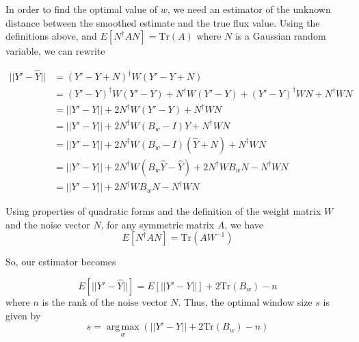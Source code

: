 In order to find the optimal value of $w$, we need an estimator of the unknown distance between the smoothed estimate and the true flux value. Using the definitions above, and $E[N^\dagger A N]=\mathrm{Tr}(A)$ where $N$ is a Gaussian random variable, we can rewrite

\begin{align*}
    ||Y'-\hat{Y}|| &= (Y'-Y+N)^\dagger W(Y'-Y+N)\\
    &= (Y'-Y)^\dagger W(Y'-Y)+N^\dagger W(Y'-Y) + (Y'-Y)^\dagger W N + N^\dagger W N\\
    &= ||Y'-Y||+2N^\dagger W(Y'-Y)+N^\dagger WN\\
    &= ||Y'-Y||+2N^\dagger W(B_w - I)Y + N^\dagger WN\\
    &= ||Y'-Y||+2N^\dagger W(B_w - I)(\hat{Y}+N) + N^\dagger WN\\
    &= ||Y'-Y||+2N^\dagger W (B_w\hat{Y}-\hat{Y}) + 2N^\dagger W B_w N - N^\dagger W N\\
    &= ||Y'-Y|| + 2N^\dagger W B_w N - N^\dagger W N
\end{align*}

Using properties of quadratic forms and the definition of the weight matrix $W$ and the noise vector $N$, for any symmetric matrix $A$, we have
\begin{equation}
    E[N^\dagger A N] = \mathrm{Tr}(AW^{-1})
\end{equation}

So, our estimator becomes

\begin{equation}
    E[||Y'-\hat{Y}||] = E[||Y'-Y||] + 2 \mathrm{Tr}(B_w) - n
\end{equation}
where $n$ is the rank of the noise vector $N$. Thus, the optimal window size $s$ is given by
\begin{equation}
    s = \operatorname*{arg\,max}_w \left(||Y'-Y|| + 2 \mathrm{Tr}(B_w) - n\right)
\end{equation}

